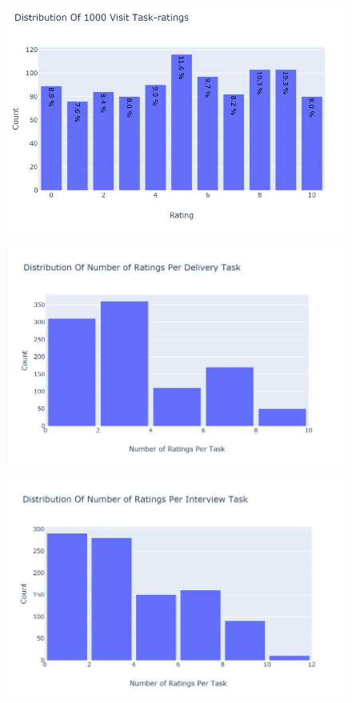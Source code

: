 \documentclass{aifyp}
\begin{document}
\begin{appendices}
\begin{figure}[H]
    \includegraphics[scale=0.5]{Images/Chapter6/DistvisitRatings.JPG}
    \label{fig:DistVisitRatingsBarchart}
\end{figure}
\begin{figure}[H]
    \centering
    \includegraphics[scale=0.5]{Images/Chapter6/DistofNumofDelivRatingPerTask.JPG}
    \label{fig:DistNumRatingPerDeliveryBarchart}
\end{figure}
\begin{figure}[H]
    \centering
    \includegraphics[scale=0.5]{Images/Chapter6/DistofNumofIntRatingPerTask.JPG}

\end{figure}
\end{appendices}
\end{document}
